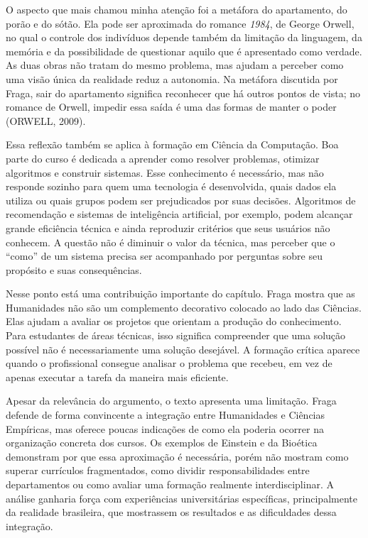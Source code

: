 \documentclass[12pt,a4paper]{article}
\begin{document}
O aspecto que mais chamou minha atenção foi a metáfora do apartamento, do porão e do sótão. Ela pode ser aproximada do romance \textit{1984}, de George Orwell, no qual o controle dos indivíduos depende também da limitação da linguagem, da memória e da possibilidade de questionar aquilo que é apresentado como verdade. As duas obras não tratam do mesmo problema, mas ajudam a perceber como uma visão única da realidade reduz a autonomia. Na metáfora discutida por Fraga, sair do apartamento significa reconhecer que há outros pontos de vista; no romance de Orwell, impedir essa saída é uma das formas de manter o poder (ORWELL, 2009).

Essa reflexão também se aplica à formação em Ciência da Computação. Boa parte do curso é dedicada a aprender como resolver problemas, otimizar algoritmos e construir sistemas. Esse conhecimento é necessário, mas não responde sozinho para quem uma tecnologia é desenvolvida, quais dados ela utiliza ou quais grupos podem ser prejudicados por suas decisões. Algoritmos de recomendação e sistemas de inteligência artificial, por exemplo, podem alcançar grande eficiência técnica e ainda reproduzir critérios que seus usuários não conhecem. A questão não é diminuir o valor da técnica, mas perceber que o ``como'' de um sistema precisa ser acompanhado por perguntas sobre seu propósito e suas consequências.

Nesse ponto está uma contribuição importante do capítulo. Fraga mostra que as Humanidades não são um complemento decorativo colocado ao lado das Ciências. Elas ajudam a avaliar os projetos que orientam a produção do conhecimento. Para estudantes de áreas técnicas, isso significa compreender que uma solução possível não é necessariamente uma solução desejável. A formação crítica aparece quando o profissional consegue analisar o problema que recebeu, em vez de apenas executar a tarefa da maneira mais eficiente.

Apesar da relevância do argumento, o texto apresenta uma limitação. Fraga defende de forma convincente a integração entre Humanidades e Ciências Empíricas, mas oferece poucas indicações de como ela poderia ocorrer na organização concreta dos cursos. Os exemplos de Einstein e da Bioética demonstram por que essa aproximação é necessária, porém não mostram como superar currículos fragmentados, como dividir responsabilidades entre departamentos ou como avaliar uma formação realmente interdisciplinar. A análise ganharia força com experiências universitárias específicas, principalmente da realidade brasileira, que mostrassem os resultados e as dificuldades dessa integração.
\end{document}
